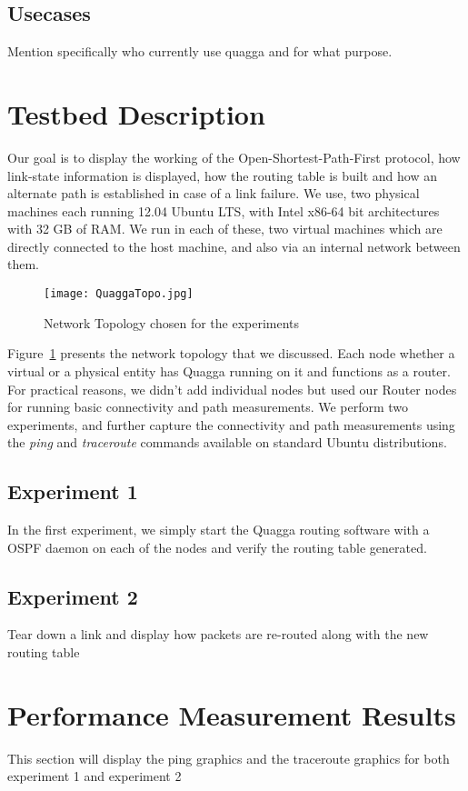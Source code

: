 \documentclass{article}
\begin{document}
\subsection{Usecases}
Mention specifically who currently use quagga and for what purpose.
\clearpage
\section{Testbed Description}
Our goal is to display the working of the Open-Shortest-Path-First protocol, how link-state information is displayed,
how the routing table is built and how an alternate path is established in case of a link failure.
We use, two physical machines each running 12.04 Ubuntu LTS, with Intel x86-64 bit architectures with
32 GB of RAM. We run in each of these, two virtual machines which are directly connected to the host machine,
and also via an internal network between them.
\begin{figure}[ht!]
  \centering
  \texttt{[image: QuaggaTopo.jpg]}
  \caption{Network Topology chosen for the experiments}
  \label{fig:networktopo}
\end{figure}
Figure~\ref{fig:networktopo} presents the network topology that we discussed. Each node whether a virtual or a physical
entity has Quagga running on it and functions as a router. For practical reasons, we didn't add individual nodes
but used our Router nodes for running basic connectivity and path measurements. We perform two experiments, and
further capture the connectivity and path measurements using the \textit{ping} and \textit{traceroute} commands 
available on standard Ubuntu distributions.
\subsection{Experiment 1}
In the first experiment, we simply start the Quagga routing software with a OSPF daemon on each of the nodes
and verify the routing table generated.
\subsection{Experiment 2}
Tear down a link and display how packets are re-routed along with the new routing table
\clearpage
\section{Performance Measurement Results}
This section will display the ping graphics and the traceroute graphics for both experiment 1 and experiment 2
\end{document}

